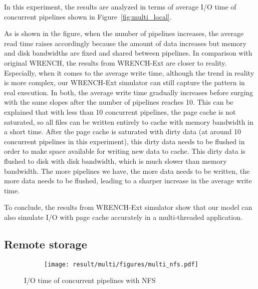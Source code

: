 \documentclass[conference]{IEEEtran}
\begin{document}
            In this experiment, the results are analyzed in terms of average I/O time 
            of concurrent pipelines shown in Figure~\ref{fig:multi_local}.
            
            As is shown in the figure, when the number of pipelines increases, 
            the average read time raises accordingly because the amount of data 
            increases but memory and disk bandwidths are fixed and shared between pipelines. 
            In comparison with original WRENCH, the results from WRENCH-Ext are closer 
            to reality. 
            Especially, when it comes to the average write time, 
            although the trend in reality is more complex, our WRENCH-Ext 
            simulator can still capture the pattern in real execution.
            In both, the average write time gradually increases before surging with the 
            same slopes after the number of pipelines reaches 10. 
            This can be explained that with less than 10 concurrent pipelines, 
            the page cache is not saturated, so all files can be written entirely to 
            cache with memory bandwidth in a short time. 
            After the page cache is saturated with dirty data (at around 
            10 concurrent pipelines in this experiment), this dirty data needs 
            to be flushed in order to make space available for writing new data to cache. 
            This dirty data is flushed to disk with disk bandwidth, which is much  
            slower than memory bandwidth. 
            The more pipelines we have, the more data needs to be written, the more data 
            needs to be flushed, leading to a sharper increase in the average write time. 
            
            To conclude, the results from WRENCH-Ext simulator show that 
            our model can also simulate I/O with page cache accurately in a 
            multi-threaded application.  
            
        \subsection{Remote storage}
        
            \begin{figure*}        
            \begin{subfigure}{\linewidth}
                \centering
                   \texttt{[image: result/multi/figures/multi\_nfs.pdf]}
            \end{subfigure}        
            \caption{I/O time of concurrent pipelines with NFS}
            \label{fig:multi_nfs}
            \end{figure*}
        
\end{document}
